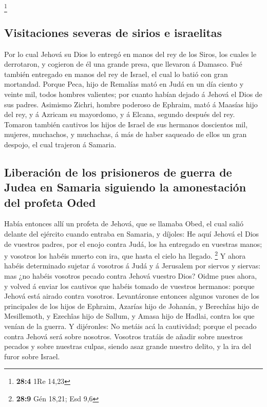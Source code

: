 \footnote{\textbf{28:4} 1Re 14,23}

\hypertarget{visitaciones-severas-de-sirios-e-israelitas}{%
\subsection{Visitaciones severas de sirios e
israelitas}\label{visitaciones-severas-de-sirios-e-israelitas}}

 Por lo cual Jehová su Dios lo entregó en manos del rey de
los Siros, los cuales le derrotaron, y cogieron de él una grande presa,
que llevaron á Damasco. Fué también entregado en manos del rey de
Israel, el cual lo batió con gran mortandad.  Porque Peca,
hijo de Remalías mató en Judá en un día ciento y veinte mil, todos
hombres valientes; por cuanto habían dejado á Jehová el Dios de sus
padres.  Asimismo Zichri, hombre poderoso de Ephraim, mató
á Maasías hijo del rey, y á Azricam su mayordomo, y á Elcana, segundo
después del rey.  Tomaron también cautivos los hijos de
Israel de sus hermanos doscientos mil, mujeres, muchachos, y muchachas,
á más de haber saqueado de ellos un gran despojo, el cual trajeron á
Samaria.

\hypertarget{liberaciuxf3n-de-los-prisioneros-de-guerra-de-judea-en-samaria-siguiendo-la-amonestaciuxf3n-del-profeta-oded}{%
\subsection{Liberación de los prisioneros de guerra de Judea en Samaria
siguiendo la amonestación del profeta
Oded}\label{liberaciuxf3n-de-los-prisioneros-de-guerra-de-judea-en-samaria-siguiendo-la-amonestaciuxf3n-del-profeta-oded}}

 Había entonces allí un profeta de Jehová, que se llamaba
Obed, el cual salió delante del ejército cuando entraba en Samaria, y
díjoles: He aquí Jehová el Dios de vuestros padres, por el enojo contra
Judá, los ha entregado en vuestras manos; y vosotros los habéis muerto
con ira, que hasta el cielo ha llegado. \footnote{\textbf{28:9} Gén
  18,21; Esd 9,6}  Y ahora habéis determinado sujetar á
vosotros á Judá y á Jerusalem por siervos y siervas: mas ¿no habéis
vosotros pecado contra Jehová vuestro Dios?  Oidme pues
ahora, y volved á enviar los cautivos que habéis tomado de vuestros
hermanos: porque Jehová está airado contra vosotros. 
Levantáronse entonces algunos varones de los principales de los hijos de
Ephraim, Azarías hijo de Johanán, y Berechîas hijo de Mesillemoth, y
Ezechîas hijo de Sallum, y Amasa hijo de Hadlai, contra los que venían
de la guerra.  Y dijéronles: No metáis acá la cautividad;
porque el pecado contra Jehová será sobre nosotros. Vosotros tratáis de
añadir sobre nuestros pecados y sobre nuestras culpas, siendo asaz
grande nuestro delito, y la ira del furor sobre Israel.

